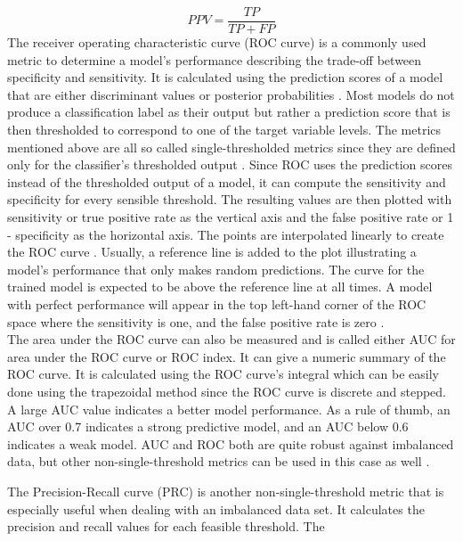\begin{equation}
 PPV = \frac{TP}{TP+FP}
 \label{eq:ppv}
\end{equation}
The receiver operating characteristic curve (ROC curve) is a commonly used 
metric to determine a model's performance describing the trade-off between 
specificity and sensitivity. It is calculated using the prediction scores of a 
model that are either discriminant values or posterior 
probabilities \cite{RN161}. Most models do not produce a classification label 
as their output but rather a prediction score that is then thresholded to 
correspond to one of the target variable levels. The metrics mentioned above 
are all 
so called single-thresholded metrics since they are defined only for the 
classifier's thresholded output \cite{RN161, RN167}. Since ROC uses the 
prediction scores instead of the thresholded output of a model, it can compute 
the sensitivity and specificity for every sensible threshold. The resulting 
values are then plotted with sensitivity or true positive rate as the vertical 
axis and the false positive rate or 1 - specificity as the 
horizontal axis. The points are interpolated linearly to create the ROC curve  
\cite{RN161}. Usually, a reference line is added to the plot illustrating a 
model's performance that only makes random predictions. The curve for the 
trained model is expected to be above the reference line at all times. 
A model with perfect performance will appear in the top left-hand corner 
of the ROC space where the sensitivity is one, and the false positive rate is 
zero \cite{RN167, RN159}.
\\
The area under the ROC curve can also be measured and is called either AUC for 
area under the ROC curve or ROC index. It can give a numeric summary of the ROC 
curve. It is calculated using the ROC curve's integral which can be easily 
done using the trapezoidal method since the ROC curve is discrete and stepped. 
A large AUC value indicates a better model performance. As a rule of thumb, an 
AUC over 0.7 indicates a strong predictive model, and an AUC below 0.6 
indicates 
a weak model. AUC and ROC both are quite robust against imbalanced data, but 
other non-single-threshold metrics can be used in this case as 
well \cite{RN167, RN159}.
\par
The Precision-Recall curve (PRC) is another non-single-threshold metric that is 
especially useful when dealing with an imbalanced data set. It calculates the 
precision and recall values for each feasible threshold. The 
